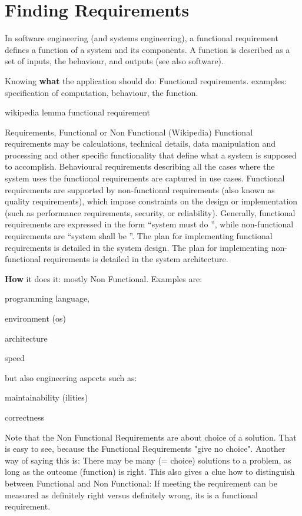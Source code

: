 \documentclass[\docroot/main]{subfiles}
\begin{document}
\chapter{Finding Requirements}
In software engineering (and systems engineering), a functional
requirement defines a function of a system and its components. A
function is described as a set of inputs, the behaviour, and outputs
(see also software).

Knowing \textbf{what} the application should do: Functional requirements.
examples: specification of computation, behaviour, the function.

wikipedia lemma functional requirement
\begin{textbox}{Requirements, Functional or Non Functional (Wikipedia)}
  Functional requirements may be calculations, technical details, data
  manipulation and processing and other specific functionality that
  define what a system is supposed to accomplish. Behavioural
  requirements describing all the cases where the system uses the
  functional requirements are captured in use cases. Functional
  requirements are supported by non-functional requirements (also known
  as quality requirements), which impose constraints on the design or
  implementation (such as performance requirements, security, or
  reliability). Generally, functional requirements are expressed in the
  form ``system must do '', while non-functional
  requirements are ``system shall be ''. The plan for
  implementing functional requirements is detailed in the system
  design. The plan for implementing non-functional requirements is
  detailed in the system architecture.
\end{textbox}

\textbf{How} it does it: mostly Non Functional.
Examples are:
\begin{multicols}{2}
\begin{itemize*}
\item programming language,
\item environment (os)
\item architecture
\item speed
\end{itemize*}
\vfill\columnbreak
but also engineering aspects such as:
\begin{itemize*}
  \item maintainability  (ilities)
  \item correctness
\end{itemize*}\vfill
\end{multicols}
Note that the Non Functional Requirements  are about choice of a
solution. That is easy to see, because the Functional Requirements
"give no choice". Another way of saying this is: There may be many (= choice)
solutions to a problem, as long as the outcome (function) is right.
This also gives a clue how to distinguish between Functional and Non
Functional: If meeting the requirement can be measured as  definitely right
versus definitely wrong, its is a functional requirement.
\end{document}
